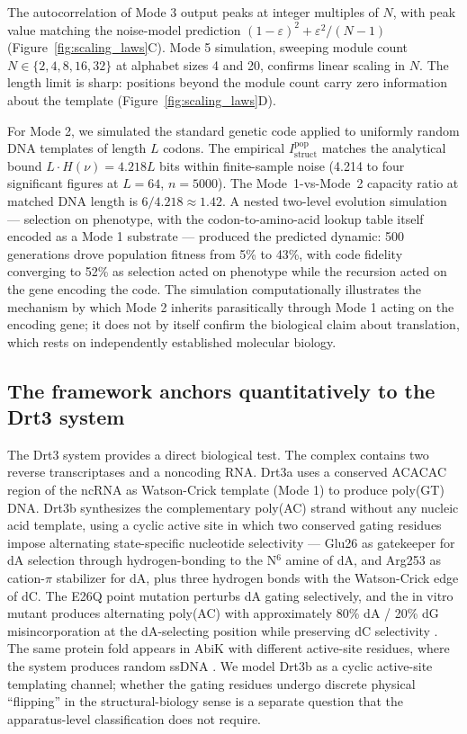 \documentclass[aps,prx,reprint,amsmath,amssymb,floatfix,superscriptaddress,nofootinbib]{revtex4-2}
\theoremstyle{plain-thm}
\theoremstyle{definition-thm}
\newcommand{\Istructpop}{I_{\mathrm{struct}}^{\mathrm{pop}}}
\begin{document}
The autocorrelation of Mode 3 output peaks at integer multiples of $N$, with peak value matching the noise-model prediction $(1 - \varepsilon)^2 + \varepsilon^2/(N - 1)$ (Figure~\ref{fig:scaling_laws}C). Mode 5 simulation, sweeping module count $N \in \{2, 4, 8, 16, 32\}$ at alphabet sizes 4 and 20, confirms linear scaling in $N$. The length limit is sharp: positions beyond the module count carry zero information about the template (Figure~\ref{fig:scaling_laws}D).

For Mode 2, we simulated the standard genetic code applied to uniformly random DNA templates of length $L$ codons. The empirical $\Istructpop$ matches the analytical bound $L \cdot H(\nu) = 4.218L$ bits within finite-sample noise (4.214 to four significant figures at $L = 64$, $n = 5000$). The Mode~1-vs-Mode~2 capacity ratio at matched DNA length is $6/4.218 \approx 1.42$. A nested two-level evolution simulation --- selection on phenotype, with the codon-to-amino-acid lookup table itself encoded as a Mode 1 substrate --- produced the predicted dynamic: 500 generations drove population fitness from 5\% to 43\%, with code fidelity converging to 52\% as selection acted on phenotype while the recursion acted on the gene encoding the code. The simulation computationally illustrates the mechanism by which Mode 2 inherits parasitically through Mode 1 acting on the encoding gene; it does not by itself confirm the biological claim about translation, which rests on independently established molecular biology.

\subsection{The framework anchors quantitatively to the Drt3 system}

The Drt3 system \citep{Deng2026} provides a direct biological test. The complex contains two reverse transcriptases and a noncoding RNA. Drt3a uses a conserved ACACAC region of the ncRNA as Watson-Crick template (Mode 1) to produce poly(GT) DNA. Drt3b synthesizes the complementary poly(AC) strand without any nucleic acid template, using a cyclic active site in which two conserved gating residues impose alternating state-specific nucleotide selectivity --- Glu26 as gatekeeper for dA selection through hydrogen-bonding to the N$^6$ amine of dA, and Arg253 as cation-$\pi$ stabilizer for dA, plus three hydrogen bonds with the Watson-Crick edge of dC. The E26Q point mutation perturbs dA gating selectively, and the in vitro mutant produces alternating poly(AC) with approximately 80\% dA / 20\% dG misincorporation at the dA-selecting position while preserving dC selectivity \citep[Fig. 4J]{Deng2026}. The same protein fold appears in AbiK with different active-site residues, where the system produces random ssDNA \citep{Deng2026}. We model Drt3b as a cyclic active-site templating channel; whether the gating residues undergo discrete physical ``flipping'' in the structural-biology sense is a separate question that the apparatus-level classification does not require.
\end{document}
